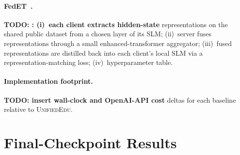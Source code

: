 \documentclass[11pt]{article}
\theoremstyle{plain}
\theoremstyle{definition}
\theoremstyle{remark}
\newcommand{\red}[1]{\textcolor{myred}{\textbf{#1}}}
\newcommand{\UniEdu}{\textsc{UnifiedEdu}}
\begin{document}
\paragraph{FedET~\citep{cheng2022fedet}.}
\red{TODO: : (i)~each client extracts hidden-state}
representations on the shared public dataset from
a chosen layer of its SLM; (ii)~server fuses
representations through a small enhanced-transformer
aggregator; (iii)~fused representations are
distilled back into each client's local SLM via a
representation-matching loss; (iv)~hyperparameter
table.

\paragraph{Implementation footprint.}
\red{TODO: insert wall-clock and OpenAI-API cost}
deltas for each baseline relative to \UniEdu{}.

\section{Final-Checkpoint Results}
\label{app:final_ckpt}
\end{document}
